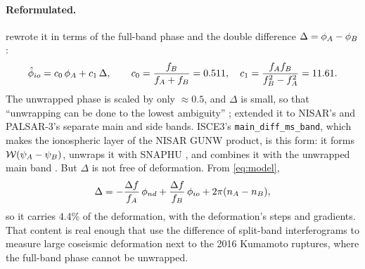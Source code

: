 \paragraph{Reformulated.} \citet{wegmuller2018reformulating} rewrote it in terms of the full-band phase and the
double difference $\Delta = \phi_A - \phi_B$:
\begin{equation}
  \hat\phi_{io} = c_0\,\phi_A + c_1\,\Delta, \qquad c_0 = \frac{f_B}{f_A+f_B} = 0.511,\quad
  c_1 = \frac{f_Af_B}{f_B^2-f_A^2} = 11.61 .
  \label{eq:reform}
\end{equation}
The unwrapped phase is scaled by only $\approx 0.5$, and $\Delta$ is small, so that ``unwrapping can be done to the
lowest ambiguity'' \citep{wegmuller2018reformulating}; \citet{wegmuller2024palsar3} extended it to NISAR's and
PALSAR-3's separate main and side bands. ISCE3's \texttt{main\_diff\_ms\_band}, which makes the ionospheric layer of
the NISAR GUNW product, is this form: it forms $\mathcal{W}(\psi_A-\psi_B)$, unwraps it with SNAPHU
\citep{chen2001snaphu,chen2002snaphu}, and combines it with the unwrapped main band \citep{isce3}. But $\Delta$
is not free of deformation. From \eqref{eq:model},
\begin{equation}
  \Delta = -\frac{\Delta f}{f_A}\,\phi_{nd} + \frac{\Delta f}{f_B}\,\phi_{io} + 2\pi(n_A - n_B),
  \label{eq:delta}
\end{equation}
so it carries 4.4\% of the deformation, with the deformation's steps and gradients. That content is real enough that \citet{ozawa2022dsi} use the difference of split-band interferograms to measure large coseismic deformation next to the 2016 Kumamoto ruptures, where the full-band phase cannot be unwrapped.

